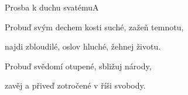 \setcounter{page}{113}
\begin{song}{Prosba k duchu svatému}{A}{}

\begin{SBVerse}

 

 

\end{SBVerse}

\begin{SBChorus}

 

 

\end{SBChorus}

\begin{SBVerse}

Probuď svým dechem kosti suché, zažeň temnotu,

najdi zbloudilé, oslov hluché, žehnej životu.

\end{SBVerse}

\begin{SBVerse}

Probuď svědomí otupené, sbližuj národy,

zavěj a přiveď zotročené v říši svobody.

\end{SBVerse}

\end{song}
